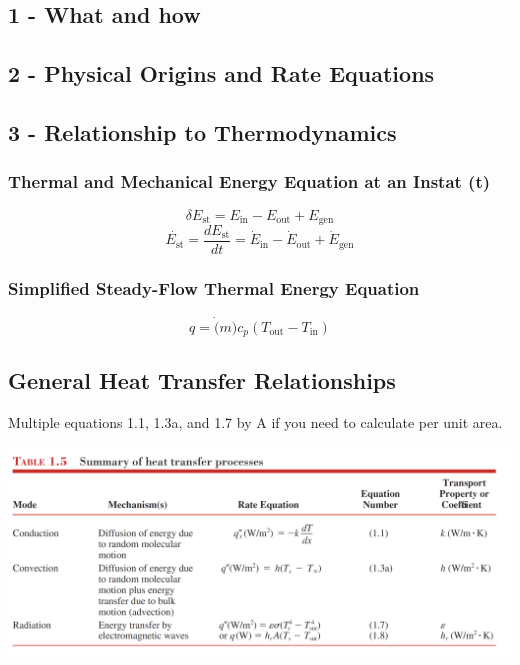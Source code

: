\documentclass[10pt,landscape]{article}
\newenvironment{Figure}
     {\par\medskip\noindent\minipage{\linewidth}}
     {\endminipage\par\medskip}
\begin{document}
\begin{multicols}{3}
\subsection{1 - What and how}
\subsection{2 - Physical Origins and Rate Equations}
\subsection{3 - Relationship to Thermodynamics}
\subsubsection{Thermal and Mechanical Energy Equation at an Instat (t)}
\begin{equation}
    \delta E_{\text{st}}=E_\text{in}-E_\text{out}+E_\text{gen}
\end{equation}
\begin{equation}
    \dot{E_{\text{st}}}=\frac{dE_\text{st}}{dt}=\dot{E}_\text{in}-\dot{E}_\text{out}+\dot{E}_\text{gen}
\end{equation}
\subsubsection{Simplified Steady-Flow Thermal Energy Equation}
\begin{equation}
    q=\dot(m)c_p(T_\text{out}-T_\text{in})
\end{equation}
\subsection{General Heat Transfer Relationships}
Multiple equations 1.1, 1.3a, and 1.7 by A if you need to calculate per unit area.
\begin{Figure}
    \centering
    \includegraphics[width=\linewidth]{Table_1_5.png}
\end{Figure}


\end{multicols}
\end{document}
